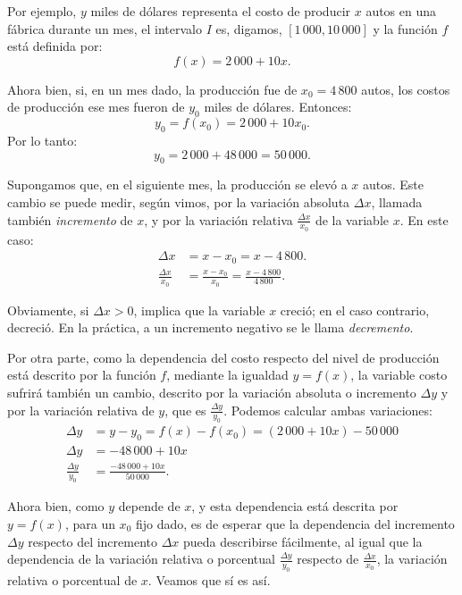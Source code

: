 Por ejemplo, $y$ miles de dólares representa el costo de producir $x$ autos en una fábrica durante
un mes, el intervalo $I$ es, digamos, $[1\,000, 10\,000]$ y la función $f$ está definida por:
\[
f(x) = 2\,000 + 10x.
\]

Ahora bien, si, en un mes dado, la producción fue de $x_0 = 4\,800$ autos, los costos de producción
ese mes fueron de $y_0$ miles de dólares. Entonces:
\[
y_0 = f(x_0) = 2\,000 + 10x_0.
\]
Por lo tanto:
\[
y_0 = 2\,000 + 48\,000 = 50\,000.
\]

Supongamos que, en el siguiente mes, la producción se elevó a $x$ autos. Este cambio se puede
medir, según vimos, por la variación absoluta $\Delta x$, llamada también \emph{incremento} de $x$,
y por la variación relativa $\frac{\Delta x}{x_0}$ de la variable $x$. En este caso:
\begin{align}
\label{eq:dm001}
\Delta x &= x - x_0 = x - 4\,800. \\
\label{eq:dm002}
\frac{\Delta x}{x_0} &= \frac{x - x_0}{x_0} = \frac{x - 4\,800}{4\,800}.
\end{align}

Obviamente, si $\Delta x > 0$, implica que la variable $x$ creció; en el caso contrario, decreció.
En la práctica, a un incremento negativo se le llama \emph{decremento}.

Por otra parte, como la dependencia del costo respecto del nivel de producción está descrito por la
función $f$, mediante la igualdad $y = f(x)$, la variable costo sufrirá también un cambio, descrito
por la variación absoluta o incremento $\Delta y$ y por la variación relativa de $y$, que es
$\frac{\Delta y}{y_0}$. Podemos calcular ambas variaciones:
\begin{align}
\Delta y &= y - y_0 = f(x) - f(x_0) = (2\,000 + 10x) - 50\,000 \nonumber \\
\label{eq:dm003}
\Delta y &= -48\,000 + 10x \\
\label{eq:dm004}
\frac{\Delta y}{y_0} &= \frac{-48\,000 + 10x}{50\,000}.
\end{align}

Ahora bien, como $y$ depende de $x$, y esta dependencia está descrita por $y = f(x)$, para un $x_0$
fijo dado, es de esperar que la dependencia del incremento $\Delta y$ respecto del incremento
$\Delta x$ pueda describirse fácilmente, al igual que la dependencia de la variación relativa o
porcentual $\frac{\Delta y}{y_0}$ respecto de $\frac{\Delta x}{x_0}$, la variación relativa o
porcentual de $x$. Veamos que sí es así.

